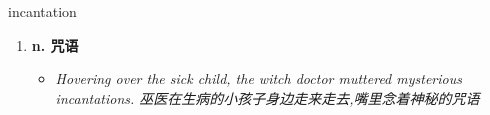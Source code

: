 
\begin{frame}
{\huge incantation}
\begin{center}
\begin{enumerate}\Large
  \item \textbf{n. 咒语}
  \begin{itemize}
    \item \em{\Large{Hovering over the sick child, the witch doctor muttered mysterious incantations. 巫医在生病的小孩子身边走来走去,嘴里念着神秘的咒语}}
  \end{itemize}
\end{enumerate}
\end{center}
\end{frame}

